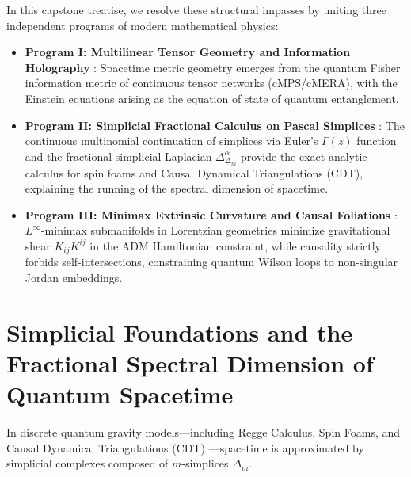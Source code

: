 \documentclass[11pt,a4paper,reqno]{amsart}
\theoremstyle{definition}
\numberwithin{equation}{section}
\begin{document}
In this capstone treatise, we resolve these structural impasses by uniting three independent programs of modern mathematical physics:
\begin{itemize}
    \item \textbf{Program I: Multilinear Tensor Geometry and Information Holography} \cite{silvafilho2026functional, silvafilho2026flows, silvafilho2026spacetime}: Spacetime metric geometry emerges from the quantum Fisher information metric of continuous tensor networks (cMPS/cMERA), with the Einstein equations arising as the equation of state of quantum entanglement.
    \item \textbf{Program II: Simplicial Fractional Calculus on Pascal Simplices} \cite{silvafilho2026pascal}: The continuous multinomial continuation of simplices via Euler's $\Gamma(z)$ function and the fractional simplicial Laplacian $\Delta_{\Delta_m}^\alpha$ provide the exact analytic calculus for spin foams and Causal Dynamical Triangulations (CDT), explaining the running of the spectral dimension of spacetime.
    \item \textbf{Program III: Minimax Extrinsic Curvature and Causal Foliations} \cite{silvafilho2026noneuclidean}: $L^\infty$-minimax submanifolds in Lorentzian geometries minimize gravitational shear $K_{ij}K^{ij}$ in the ADM Hamiltonian constraint, while causality strictly forbids self-intersections, constraining quantum Wilson loops to non-singular Jordan embeddings.
\end{itemize}

\section{Simplicial Foundations and the Fractional Spectral Dimension of Quantum Spacetime}
\label{sec:simplicial_fractional}

In discrete quantum gravity models—including Regge Calculus, Spin Foams, and Causal Dynamical Triangulations (CDT) \cite{ambjorn2005spectral}—spacetime is approximated by simplicial complexes composed of $m$-simplices $\Delta_m$.
\end{document}
